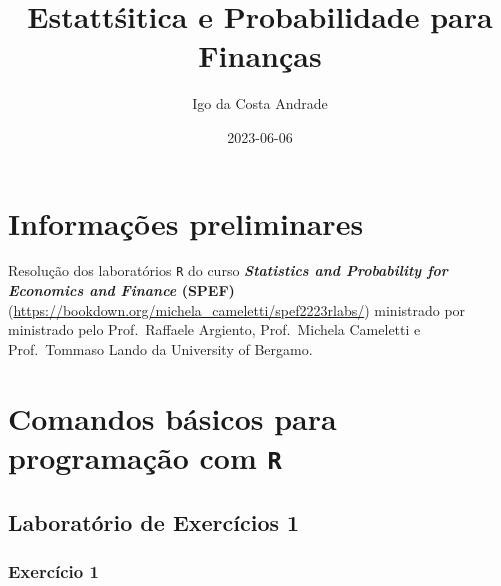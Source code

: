 \documentclass[
]{article}
\title{Estattśitica e Probabilidade para Finanças}
\author{Igo da Costa Andrade}
\date{2023-06-06}
\begin{document}
\maketitle

{
\setcounter{tocdepth}{2}
\tableofcontents
}
\newpage

\hypertarget{informauxe7uxf5es-preliminares}{%
\section*{Informações preliminares}\label{informauxe7uxf5es-preliminares}}

Resolução dos laboratórios \texttt{R} do curso \textbf{\emph{Statistics and Probability for Economics and Finance} (SPEF)} (\url{https://bookdown.org/michela_cameletti/spef2223rlabs/}) ministrado por ministrado pelo Prof.~Raffaele Argiento, Prof.~Michela Cameletti e Prof.~Tommaso Lando da University of Bergamo.

\hypertarget{comandos-buxe1sicos-para-programauxe7uxe3o-com-r}{%
\section{\texorpdfstring{Comandos básicos para programação com \texttt{R}}{Comandos básicos para programação com R}}\label{comandos-buxe1sicos-para-programauxe7uxe3o-com-r}}

\hypertarget{laboratuxf3rio-de-exercuxedcios-1}{%
\subsection{Laboratório de Exercícios 1}\label{laboratuxf3rio-de-exercuxedcios-1}}

\hypertarget{exercuxedcio-1}{%
\subsubsection{Exercício 1}\label{exercuxedcio-1}}
\end{document}
